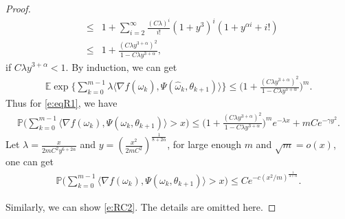 \documentclass[12pt]{amsart}
\theoremstyle{definition}
\theoremstyle{remark}
\numberwithin{equation}{section}
\newcommand{\E}{\mathbb{E}}            %
\newcommand{\Ll}{\langle}
\newcommand{\Rr}{\rangle}
\newcommand{\PP}{\mathbb{P}}
\begin{document}
\begin{proof}
\begin{eqnarray*}
		&\le&1+\sum_{i=2}^\infty\frac{(C\lambda)^i}{i!}(1+y^3)^i (1+y^{\alpha i}+i!)\\
		&\le&1+\frac{(C\lambda y^{3+\alpha})^2}{1-C\lambda y^{3+\alpha}},
	\end{eqnarray*}
	if $C\lambda y^{3+\alpha}<1$. By induction, we can get
	\begin{eqnarray*}
		\E\exp\Big\{\sum_{k=0}^{m-1}\lambda\Ll \nabla f(\hat\omega_k),\Psi(\hat\omega_k,\theta_{k+1})\Rr\Big\}\le \Big( 1+\frac{(C\lambda y^{3+\alpha})^2}{1-C\lambda y^{3+\alpha}}\Big)^m.
	\end{eqnarray*}	
	Thus for \eqref{e:eqR1}, we have
	\begin{eqnarray*}
		\PP\Big(\sum_{k=0}^{m-1} \Ll \nabla f(\omega_k), \Psi(\omega_k,\theta_{k+1}) \Rr >x\Big)\le \Big( 1+\frac{(C\lambda y^{3+\alpha})^2}{1-C\lambda y^{3+\alpha}}\Big)^m e^{-\lambda x}   + mCe^{-\gamma y^2}.
	\end{eqnarray*}
	Let $\lambda=\frac{x}{2mC^2y^{6+2\alpha}}$ and $y=(\frac{x^2}{2mC^2})^{\frac{1}{8+2\alpha}}$,
	for large enough $m$ and $\sqrt m=o(x)$, one can get
	\begin{eqnarray*}
		\PP\Big(\sum_{k=0}^{m-1} \Ll \nabla f(\omega_k), \Psi(\omega_k,\theta_{k+1}) \Rr >x\Big)\le  Ce^{-c(x^2/m)^{\frac{1}{4+\alpha}}}.
	\end{eqnarray*}
	
	Similarly, we can show \eqref{e:RC2}. The details are  omitted here.
\end{proof}
\end{document}
